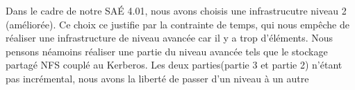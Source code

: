 \documentclass[../Livrable1.tex]{subfiles}
\begin{document}
Dans le cadre de notre SAÉ 4.01, nous avons choisis une infrastrucutre niveau 2 (améliorée).
Ce choix ce justifie par la contrainte de temps, qui nous empêche de réaliser une infrastructure de 
niveau avancée car il y a trop d'éléments. Nous pensons néamoins réaliser une partie du niveau avancée
tels que le stockage partagé NFS couplé au Kerberos. Les deux parties(partie 3 et partie 2) n'étant pas 
incrémental, nous avons la liberté de passer d'un niveau à un autre
\end{document}
